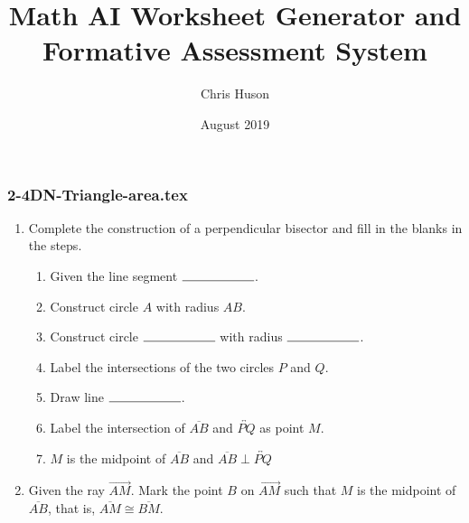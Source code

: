 \documentclass[12pt, twoside]{article}
\title{Math AI Worksheet Generator and Formative Assessment System}
\author{Chris Huson}
\date{August 2019}
\begin{document}
\subsubsection*{2-4DN-Triangle-area.tex}
\begin{enumerate}
\item Complete the construction of a perpendicular bisector and fill in the blanks in the steps.
      \begin{enumerate}
        \item Given the line segment $\rule{2cm}{0.15mm}$.
        \item Construct circle $A$ with radius $AB$.
        \bigskip
        \item Construct circle $\rule{2cm}{0.15mm}$  with radius $\rule{2cm}{0.15mm}$. 
        \item Label the intersections of the two circles $P$ and $Q$. \bigskip
        \item Draw line $\rule{2cm}{0.15mm}$.
        \item Label the intersection of $\overline{AB}$ and $\overleftrightarrow{PQ}$ as point $M$.
        \item $M$ is the midpoint of $\overline{AB}$ and $\overline{AB} \perp \overleftrightarrow{PQ}$
      \end{enumerate}
      \vspace{7cm}
      \begin{center}
      \end{center}

\newpage

\item Given the ray $\overrightarrow{AM}$. Mark the point $B$ on $\overrightarrow{AM}$ such that $M$ is the midpoint of $\overline{AB}$,  that is, $\overline{AM} \cong \overline{BM}$.\\[0.75cm]
\vspace{1cm}


\end{enumerate}
\end{document}
